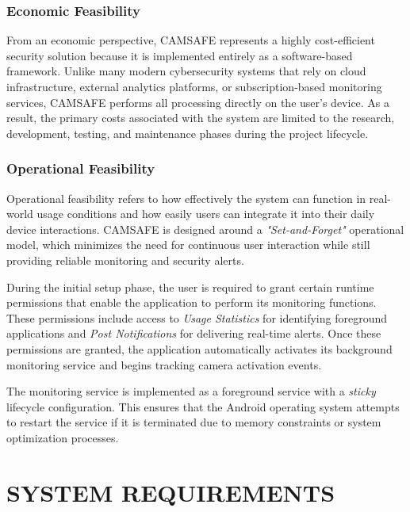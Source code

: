 \documentclass[12pt,a4paper]{report}
\begin{document}
\begin{enumerate}
   \subsection{Economic Feasibility}

From an economic perspective, CAMSAFE represents a highly cost-efficient
security solution because it is implemented entirely as a software-based
framework. Unlike many modern cybersecurity systems that rely on cloud
infrastructure, external analytics platforms, or subscription-based monitoring
services, CAMSAFE performs all processing directly on the user’s device. As a
result, the primary costs associated with the system are limited to the
research, development, testing, and maintenance phases during the project
lifecycle.

\subsection{Operational Feasibility}

Operational feasibility refers to how effectively the system can function in
real-world usage conditions and how easily users can integrate it into their
daily device interactions. CAMSAFE is designed around a \textit{"Set-and-Forget"}
operational model, which minimizes the need for continuous user interaction
while still providing reliable monitoring and security alerts.

During the initial setup phase, the user is required to grant certain runtime
permissions that enable the application to perform its monitoring functions.
These permissions include access to \textit{Usage Statistics} for identifying
foreground applications and \textit{Post Notifications} for delivering real-time
alerts. Once these permissions are granted, the application automatically
activates its background monitoring service and begins tracking camera
activation events.

The monitoring service is implemented as a foreground service with a
\textit{sticky} lifecycle configuration. This ensures that the Android operating
system attempts to restart the service if it is terminated due to memory
constraints or system optimization processes. 



    \chapter{SYSTEM REQUIREMENTS}


\end{enumerate}
\end{document}
